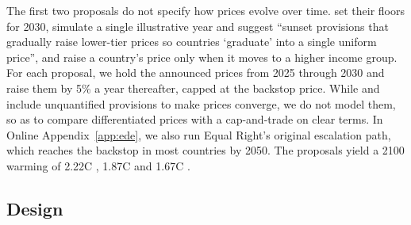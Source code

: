 \documentclass[12pt,english]{article}
\theoremstyle{remark}
\begin{document}
The first two proposals do not specify how prices evolve over time. \citet{parry_proposal_2021} set their floors for 2030, \citet{wolfram_building_2025} simulate a single illustrative year and suggest ``sunset provisions that gradually raise lower-tier prices so countries `graduate' into a single uniform price'', and \citet{banerjee_grand_2025} raise a country's price only when it moves to a higher income group. %
For each proposal, we hold the announced prices from 2025 through 2030 and raise them by 5\% a year thereafter, capped at the backstop price. 
While \cite{wolfram_building_2025} and \citet{banerjee_grand_2025} include unquantified provisions to make prices converge, we do not model them, so as to compare differentiated prices with a cap-and-trade on clear terms. In Online Appendix~\ref{app:ede}, we also run Equal Right's original escalation path, which reaches the backstop in most countries by 2050. %
The proposals yield a 2100 warming of 2.22\textdegree C \citep{wolfram_building_2025}, 1.87\textdegree C \citep{banerjee_grand_2025} and 1.67\textdegree C \citep{equal_right_climate_2023}. %

\subsection{Design}
\end{document}
